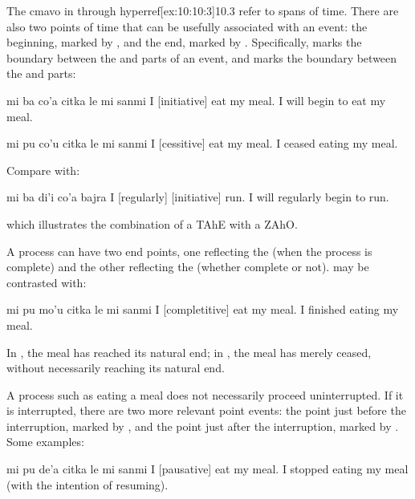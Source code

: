 The cmavo in  through hyperref[ex:10:10:3]{10.3} refer to spans of time. There are also
    two points of time that can be usefully associated with an
    event: the beginning, marked by , and the end, marked
    by . Specifically,  marks the boundary between
    the  and  parts of an event, and  marks
    the boundary between the  and  parts:
\begin{example}
mi ba co'a citka le mi sanmi\n
I  [initiative] eat my meal.\n
I will begin to eat my meal.
\end{example}

\begin{example}
mi pu co'u citka le mi sanmi\n
I  [cessitive] eat my meal.\n
I ceased eating my meal.
\end{example}

Compare  with:
\begin{example}
mi ba di'i co'a bajra\n
I  [regularly] [initiative] run.\n
I will regularly begin to run.
\end{example}

{\noindent}which illustrates the combination of a TAhE with a ZAhO. 

A process can have two end points, one reflecting the
     (when the process is complete) and the other
    reflecting the  (whether complete or
    not).  may be contrasted
    with:
\begin{example}
mi pu mo'u citka le mi sanmi\n
I  [completitive] eat my meal.\n
I finished eating my meal.
\end{example}

In , the meal has reached
    its natural end; in , the meal
    has merely ceased, without necessarily reaching its natural
    end.

A process such as eating a meal does not necessarily proceed
    uninterrupted. If it is interrupted, there are two more
    relevant point events: the point just before the interruption,
    marked by , and the point just after the interruption,
    marked by . Some examples:
\begin{example}
mi pu de'a citka le mi sanmi\n
I  [pausative] eat my meal.\n
I stopped eating my meal\n
\T	(with the intention of resuming).
\end{example}

